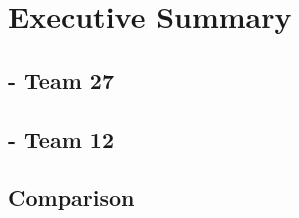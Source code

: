 \chapter{Executive Summary}


\section{\doge - Team 27}
\section{\gnb - Team 12}
\section{Comparison}
